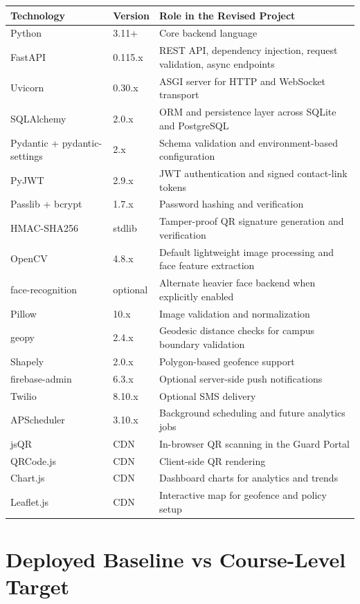 \documentclass[12pt,letterpaper]{article}
\begin{document}
\begin{tabularx}{\textwidth}{@{}L{3.3cm}L{1.8cm}Y@{}}
\toprule
\textbf{Technology} & \textbf{Version} & \textbf{Role in the Revised Project} \\
\midrule
Python & 3.11+ & Core backend language \\
FastAPI & 0.115.x & REST API, dependency injection, request validation, async endpoints \\
Uvicorn & 0.30.x & ASGI server for HTTP and WebSocket transport \\
SQLAlchemy & 2.0.x & ORM and persistence layer across SQLite and PostgreSQL \\
Pydantic + pydantic-settings & 2.x & Schema validation and environment-based configuration \\
PyJWT & 2.9.x & JWT authentication and signed contact-link tokens \\
Passlib + bcrypt & 1.7.x & Password hashing and verification \\
HMAC-SHA256 & stdlib & Tamper-proof QR signature generation and verification \\
OpenCV & 4.8.x & Default lightweight image processing and face feature extraction \\
face-recognition & optional & Alternate heavier face backend when explicitly enabled \\
Pillow & 10.x & Image validation and normalization \\
geopy & 2.4.x & Geodesic distance checks for campus boundary validation \\
Shapely & 2.0.x & Polygon-based geofence support \\
firebase-admin & 6.3.x & Optional server-side push notifications \\
Twilio & 8.10.x & Optional SMS delivery \\
APScheduler & 3.10.x & Background scheduling and future analytics jobs \\
jsQR & CDN & In-browser QR scanning in the Guard Portal \\
QRCode.js & CDN & Client-side QR rendering \\
Chart.js & CDN & Dashboard charts for analytics and trends \\
Leaflet.js & CDN & Interactive map for geofence and policy setup \\
\bottomrule
\end{tabularx}

\section{Deployed Baseline vs Course-Level Target}
\end{document}
